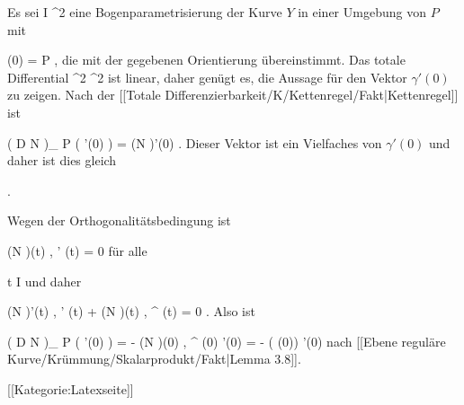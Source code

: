 {

Es sei
\maabb {\gamma} { I } { \R^2
} {}
eine Bogenparametrisierung der Kurve $Y$ in einer Umgebung von $P$  mit

\mavergleichskette
{\vergleichskette
{ \gamma (0)
}
{ = }{ P
}
{  }{
}
{    }{
}
{   }{
}
}
{}{}{,}
die mit der gegebenen Orientierung übereinstimmt. Das totale Differential
 { \R^2} {\R^2
} {}
ist linear, daher genügt es, die Aussage für den Vektor $\gamma'(0)$ zu zeigen. Nach
der [[Totale Differenzierbarkeit/K/Kettenregel/Fakt|Kettenregel]]
ist

\mavergleichskettedisp
{\vergleichskette
{ \left(  D N   \right)_{ P } \left(   \gamma'(0)  \right)
}
{ =} { (N \circ \gamma )'(0)
}
{ } {
}
{ } {
}
{ } {
}
}
{}{}{.}
Dieser Vektor ist ein Vielfaches von $\gamma'(0)$ und daher ist dies gleich

 { . }

Wegen der Orthogonalitätsbedingung ist

\mavergleichskettedisp
{\vergleichskette
{ \left\langle  (N \circ  \gamma)(t) ,  \gamma' (t)   \right\rangle
}
{ =} { 0
}
{ } {
}
{ } {
}
{ } {
}
}
{}{}{}
für alle

\mavergleichskette
{\vergleichskette
{ t
}
{ \in }{ I
}
{  }{
}
{    }{
}
{   }{
}
}
{}{}{}
und daher

\mavergleichskettedisp
{\vergleichskette
{ \left\langle  (N \circ  \gamma)'(t) ,  \gamma' (t)   \right\rangle + \left\langle  (N \circ  \gamma)(t) ,  \gamma^{\prime \prime} (t)   \right\rangle
}
{ =} { 0
}
{ } {
}
{ } {
}
{ } {
}
}
{}{}{.}
Also ist

\mavergleichskettedisp
{\vergleichskette
{ \left(  D N   \right)_{ P } \left(   \gamma'(0)  \right)
}
{ =} { - \left\langle  (N \circ  \gamma)(0) ,  \gamma^{\prime \prime} (0)   \right\rangle  \gamma'(0)
}
{ =} { - \kappa( \gamma(0)) \gamma'(0)
}
{ } {
}
{ } {
}
}
{}{}{}
nach
[[Ebene reguläre Kurve/Krümmung/Skalarprodukt/Fakt|Lemma 3.8]].

}

 [[Kategorie:Latexseite]]
